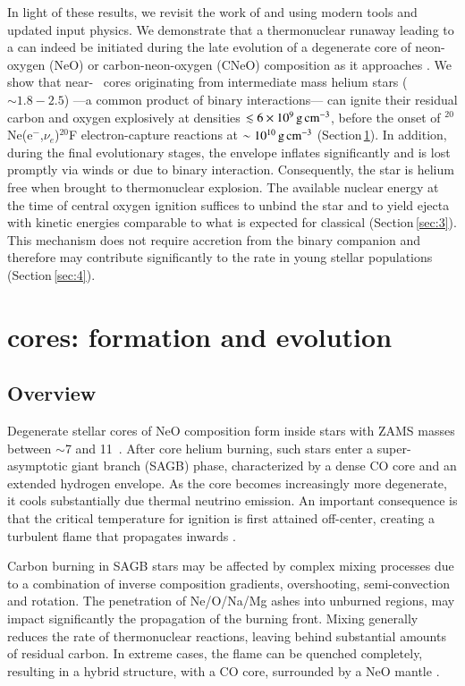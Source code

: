 \documentclass[twocolumn]{aa}
\begin{document}
In light of these results, we revisit the work of \cite{waldman2006a} and \cite{waldman2008} using modern tools and updated input physics. We  demonstrate that a 
thermonuclear runaway leading to a \ia can indeed be initiated during the late evolution of a degenerate core of neon-oxygen 
(NeO) or carbon-neon-oxygen (CNeO) composition as it  approaches  \mch. We show that near-\mch~ \one cores originating from intermediate mass helium stars ($\sim 1.8-2.5$\msun) ---a common product of binary interactions--- can ignite their residual carbon and oxygen explosively at  
densities $\lesssim 6\times 10^{9}\mathrm{\,g\,cm^{-3}}$, 
before the onset of {\rm $^{20}$Ne(e$^-$,$\nu_e$)$^{20}$F} 
electron-capture reactions at $\sim 10^{10}\mathrm{\,g\,cm^{-3}}$ (Section\,\ref{sec:2}). 
In addition, during the final evolutionary stages, the envelope inflates significantly and is lost promptly  via winds or due to binary interaction. Consequently, the star is helium free when brought to thermonuclear explosion.   
The available nuclear energy at the time of central oxygen ignition suffices to unbind the star 
and to yield ejecta with kinetic energies comparable to what is expected for classical \ias (Section\,\ref{sec:3}).
 This mechanism  does not require accretion from the binary companion and 
 therefore may contribute significantly to the \ia  rate in young stellar populations (Section\,\ref{sec:4}). 
 

\section{\one cores: formation and evolution}\label{sec:2}
\subsection{Overview}
Degenerate stellar cores of NeO composition form inside stars with ZAMS masses  
between $\sim$7 and 11\msun\ \citep[e.g.][]{poelarends2007,Poelarends:2007ip,Farmer:2015afs}. 
After core helium burning, such stars enter a super-asymptotic giant branch 
(SAGB) phase, characterized by a dense CO  
core and an  extended hydrogen envelope.  
As the core becomes increasingly more degenerate, it cools substantially 
due thermal neutrino emission. An important consequence is that the critical 
temperature for  ignition is first attained off-center, creating a 
turbulent flame that propagates inwards \citep{siess2006}. 
 

Carbon burning in SAGB stars may be affected by complex mixing processes 
due to a combination of inverse composition gradients, overshooting, 
semi-convection and rotation. The penetration of 
Ne/O/Na/Mg ashes into unburned regions, may impact significantly the propagation of
the burning front. Mixing generally reduces the rate of thermonuclear reactions, leaving 
behind substantial amounts of residual carbon. In extreme cases, the flame can be 
quenched completely, resulting in a hybrid structure,  with a CO core, 
surrounded by a NeO mantle \citep{Denissenkov:2013qaa}. 
\end{document}
